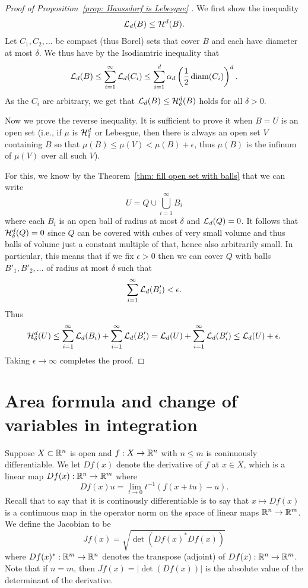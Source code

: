 \documentclass[twoside, a4paper, 10pt]{amsart}
\begin{document}
\begin{proof}[Proof of Proposition~\ref{prop: Haussdorf is Lebesgue} ] We first show the inequality $$\mathcal{L}_d(B) \leq \mathcal{H}^d(B).$$ Let $C_1, C_2,\ldots $ be compact (thus Borel) sets that cover $B$ and each have diameter at most $\delta$. We thus have by the Isodiamtric inequality that  $$\mathcal{L}_d(B) \leq \sum_{i=1}^{\infty} \mathcal{L}_d(C_i) \leq \sum_{i=1}^d \alpha_d \left(\frac{1}{2}\operatorname{diam}(C_i) \right)^d.$$ As the $C_i$ are arbitrary, we get that $\mathcal{L}_d(B) \leq \mathcal{H}^d_{\delta}(B)$ holds for all $\delta>0$.

Now we prove the reverse inequality. It is sufficient to prove it when $B = U$ is an open set (i.e., if $\mu$ is $\mathcal{H}^d_{\delta}$ or Lebesgue, then there is always an open set $V$ containing $B$ so that $\mu(B) \leq \mu(V) < \mu(B) + \epsilon$, thus $\mu(B)$ is the infinum of $\mu(V)$ over all such $V$).

For this, we know by the Theorem~\ref{thm: fill open set with balls}  that we can write $$U = Q \cup \bigcup_{i=1}^{\infty} B_i$$ where each $B_i$ is an open ball of radius at most $\delta$ and $\mathcal{L}_d(Q) = 0$. It follows that $\mathcal{H}^d_{\delta}(Q) = 0$ since $Q$ can be covered with cubes of very small volume and thus balls of volume just a constant multiple of that, hence also arbitrarily small. In particular, this means that if we fix $\epsilon>0$ then we can cover $Q$ with balls $B'_1,B'_2, \ldots$ of radius at most $\delta$ such that $$\sum_{i=1}^{\infty} \mathcal{L}_d(B'_i) < \epsilon.$$ Thus $$\mathcal{H}^d_{\delta}(U) \leq \sum_{i=1}^{\infty} \mathcal{L}_d(B_i) + \sum_{i=1}^{\infty} \mathcal{L}_d(B'_i) = \mathcal{L}_d(U) + \sum_{i=1}^{\infty} \mathcal{L}_d(B'_i)  \leq \mathcal{L}_d(U) + \epsilon. $$ Taking $\epsilon \to \infty$ completes the proof.

\end{proof}

\section{Area formula and change of variables in integration}

Suppose $X \subset \mathbb{R}^n$ is open and $f:X \to \mathbb{R}^n$ with $n \leq m$ is coninuously differentiable. We let $Df(x)$ denote the derivative of $f$ at $x \in X$, which is a linear map $Df(x):\mathbb{R}^n \to \mathbb{R}^m$ where $$Df(x)u = \lim_{t \to 0} t^{-1}(f(x+tu) - u).$$ Recall that to say that it is continously differentiable is to say that $x \mapsto Df(x)$ is a continuous map in the operator norm on the space of linear maps $\mathbb{R}^n \to \mathbb{R}^m$. 
We define the Jacobian to be $$Jf(x) = \sqrt{\det(Df(x)^*Df(x))}$$ where $Df(x)^*:\mathbb{R}^m \to \mathbb{R}^n$ denotes the transpose (adjoint) of $Df(x):\mathbb{R}^n \to \mathbb{R}^m$. Note that if $n=m$, then $Jf(x) = |\det(Df(x))|$ is the absolute value of the determinant of the derivative.
\end{document}
